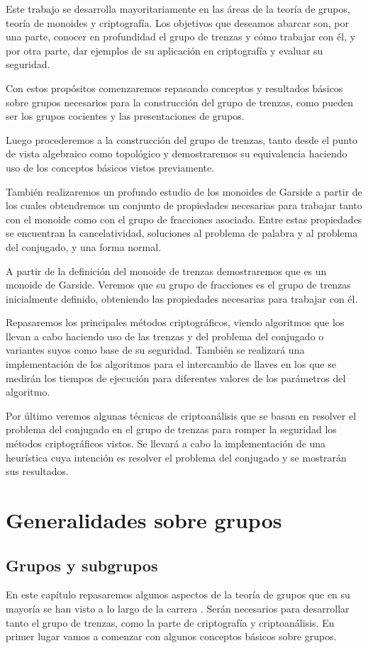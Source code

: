 \documentclass[12pt]{book}
\theoremstyle{definition}
\begin{document}
Este trabajo se desarrolla mayoritariamente en las áreas de la teoría de grupos, teoría de monoides y criptografía.  Los objetivos que deseamos abarcar son, por una parte, conocer en profundidad el grupo de trenzas y cómo trabajar con él, y por otra parte, dar ejemplos de su aplicación en criptografía y evaluar su seguridad.



Con estos propósitos comenzaremos repasando conceptos y resultados básicos sobre grupos necesarios para la construcción del grupo de trenzas, como pueden ser los grupos cocientes y las presentaciones de grupos.

Luego procederemos a la construcción del grupo de trenzas, tanto desde el punto de vista algebraico como topológico y demostraremos su equivalencia haciendo uso de los conceptos básicos vistos previamente.

También realizaremos un profundo estudio de los monoides de Garside a partir de los cuales obtendremos un conjunto de propiedades necesarias para trabajar tanto con el monoide como con el grupo de fracciones asociado. Entre estas propiedades se encuentran la cancelatividad, soluciones al problema de palabra y al problema del conjugado, y una forma normal.

A partir de la definición del monoide de trenzas demostraremos que es un monoide de Garside. Veremos que su grupo de fracciones es el grupo de trenzas inicialmente definido, obteniendo las propiedades necesarias para trabajar con él.

Repasaremos los principales métodos criptográficos, viendo algoritmos que los llevan a cabo haciendo uso de las trenzas y del problema del conjugado o variantes suyos como base de su seguridad. También se realizará una implementación de los algoritmos para el intercambio de llaves en los que se medirán los tiempos de ejecución para diferentes valores de los parámetros del algoritmo.

Por último veremos algunas técnicas de criptoanálisis que se basan en resolver el problema del conjugado en el grupo de trenzas para romper la seguridad los métodos criptográficos vistos. Se llevará a cabo la implementación de una heurística cuya intención es resolver el problema del conjugado y se mostrarán sus resultados.
\chapter{Generalidades sobre grupos}
\section{Grupos y subgrupos}
\label{sec:grupos}
En este capítulo repasaremos algunos aspectos de la teoría de grupos que en su mayoría se han visto a lo largo de la carrera \cite{group, wiki, alg_abs, free}. Serán necesarios para desarrollar tanto el grupo de trenzas, como la parte de criptografía y criptoanálisis. En primer lugar vamos a comenzar con algunos conceptos básicos sobre grupos.
\end{document}
